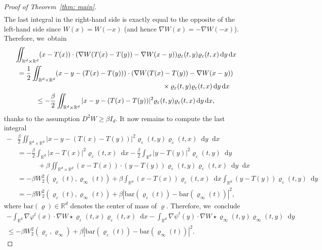 \documentclass[11pt]{article}
\numberwithin{equation}{section}
\newcommand{\dx}[1]{\mathop{}\!\mathrm{d} #1}
\newcommand{\R}{\mathbb{R}}
\theoremstyle{plain}
\theoremstyle{remark}
\begin{document}
\begin{proof}[Proof of Theorem~\ref{thm: main}]
\begin{multline*}
\end{multline*}
The last integral in the right-hand side is exactly equal to the opposite of the left-hand side since $W(x)=W(-x)$ (and hence $\nabla W(x)=-\nabla W(-x)$). Therefore, we~obtain
\begin{multline*}
\iint_{\R^d\times\R^d} (x- T(x))\cdot (\nabla W(T(x)-T(y)) - \nabla W(x-y)) \varrho_\varepsilon(t,y) \varrho_\varepsilon(t,x) \dx y \dx x\\
=\frac 12 \iint_{\R^d\times\R^d} (x-y - (T(x)-T(y)))\cdot (\nabla W(T(x)-T(y)) - \nabla W(x-y))\\[-3pt]
\shoveright{{}\times \varrho_\varepsilon(t,y) \varrho_\varepsilon(t,x) \dx y \dx x}\\
\leq -\frac \beta 2 \iint_{\R^d\times\R^d}|x-y - (T(x)-T(y))|^2\varrho_\varepsilon(t,y) \varrho_\varepsilon(t,x) \dx y \dx x,
\end{multline*}
thanks to the assumption $D^2W\geq \beta I_d$.
It now remains to compute the last integral
\begin{equation*}
\begin{split}
-&\frac \beta 2 \iint_{\R^d\times\R^d}|x-y - (T(x)-T(y))|^2\varrho_\varepsilon(t,y) \varrho_\varepsilon(t,x) \dx y \dx x\\[5pt]
&=- \frac\beta 2 \int_{\R^d} |x-T(x)|^2 \varrho_\varepsilon(t,x)\dx x -\frac \beta 2 \int_{\R^d} |y-T(y)|^2\varrho_{\varepsilon}(t,y) \dx y\\
&\qquad\quad + \beta \iint_{\R^d\times\R^d}(x-T(x))\cdot (y-T(y))\varrho_\varepsilon(t,y) \varrho_\varepsilon(t,x) \dx y \dx x\\
&=-\beta W_2^2(\varrho_\varepsilon(t), \varrho_\infty(t)) + \beta \int_{\R^d} (x - T(x))\varrho_\varepsilon(t,x) \dx x\int_{\R^d} (y - T(y))\varrho_{\varepsilon}(t,y) \dx y\\[5pt]
&=-\beta W_2^2(\varrho_\varepsilon(t), \varrho_\infty(t)) + \beta|\mathrm{bar}(\varrho_\varepsilon(t))- \mathrm{bar}(\varrho_\infty(t))|^2,
\end{split}
\end{equation*}
where $\mathrm{bar}(\varrho)\in\R^d$ denotes the center of mass of $\varrho$. Therefore, we~conclude
\begin{multline*}
-\! \int_{\R^d}\!\! \nabla \varphi^t (x) \cdot \nabla W\star \varrho_\varepsilon (t,x) \varrho_\varepsilon(t,x) \dx x - \!\int_{\R^d}\!\! \nabla \psi^t (y) \cdot \nabla W\star \varrho_\infty (t,y) \varrho_\infty(t,y) \dx y\\[3pt]
\leq -\beta W_2^2(\varrho_\varepsilon,\varrho_\infty) + \beta |\mathrm{bar}(\varrho_\varepsilon(t))- \mathrm{bar}(\varrho_\infty(t))|^2.

\end{multline*}
\end{proof}
\end{document}

